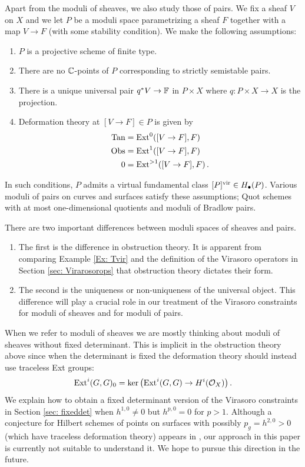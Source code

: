 \documentclass[a4paper, 12pt]{amsart}
\begin{document}
Apart from the moduli of sheaves, we also study those of pairs. We fix a sheaf $V$ on $X$ and we let $P$ be a moduli space parametrizing a sheaf $F$ together with a map $V\to F$ (with some stability condition). We make the following assumptions: 
\begin{enumerate}
\item $P$ is a projective scheme of finite type. 
\item There are no ${\mathbb{C}}$-points of $P$ corresponding to strictly semistable pairs.
\item There is a unique universal pair $q^*V\rightarrow{\mathbb{F}}$ in $P\times X$ where $q\colon P\times X\to X$ is the projection. 
\item Deformation theory at $[V\to F]\in P$ is given by
\begin{align*}
\textup{Tan}&=\textup{Ext}^0([V\to F],F)\\
\textup{Obs}&=\textup{Ext}^1([V\to F],F)\\
0&=\textup{Ext}^{>1}([V\to F],F)\,.
\end{align*}
\end{enumerate}
In such conditions, $P$ admits a virtual fundamental class $[P]^{\mathrm{vir}}\in H_\bullet(P)$. Various moduli of pairs on curves and surfaces satisfy these assumptions; Quot schemes with at most one-dimensional quotients and moduli of Bradlow pairs.

There are two important differences between moduli spaces of sheaves and pairs.
\begin{enumerate}
\item The first is the difference in obstruction theory. It is apparent from comparing Example \ref{Ex: Tvir} and the definition of the Virasoro operators in Section \ref{sec: Virarosorops} that obstruction theory dictates their form.
\item  The second is the uniqueness or non-uniqueness of the universal object. This difference will play a crucial role in our treatment of the Virasoro constraints for moduli of sheaves and for moduli of pairs.
\end{enumerate}



\begin{remark}\label{rem: tracelessobs}
When we refer to moduli of sheaves we are mostly thinking about moduli of sheaves without fixed determinant. This is implicit in the obstruction theory above since when the determinant is fixed the deformation theory should instead use traceless Ext groups:
\[\textup{Ext}^i(G,G)_0=\ker\left(\textup{Ext}^i(G,G)\to H^i({\mathcal O}_X)\right).\]
We explain how to obtain a fixed determinant version of the Virasoro constraints in Section \ref{sec: fixeddet} when $h^{1,0}\neq 0$ but $h^{p,0}=0$ for $p>1$. Although a conjecture for Hilbert schemes of points on surfaces with possibly $p_g=h^{2,0}>0$  (which have traceless deformation theory) appears in \cite{moreira}, our approach in this paper is currently not suitable to understand it. We hope to pursue this direction in the future. 
\end{remark}
\end{document}
